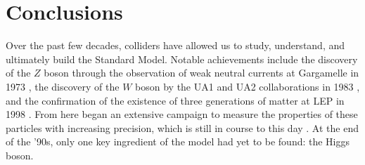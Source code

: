 \documentclass[10pt,a4paper]{book}
\begin{document}
\section{Conclusions}
Over the past few decades, colliders have allowed us to study, understand, and ultimately build the Standard Model. Notable achievements include the discovery of the $Z$ boson through the observation of weak neutral currents at Gargamelle in 1973 \cite{GargamelleNeutrino:1973jyy, HASERT1973121}, the discovery of the $W$ boson by the UA1 and UA2 collaborations in 1983 \cite{UA1:1983crd, UA2:1983tsx}, and the confirmation of the existence of three generations of matter at LEP in 1998 \cite{L3:1998uub}. From here began an extensive campaign to measure the properties of these particles with increasing precision, which is still in course to this day \cite{ATLAS:2017rzl, DeGruttola:2012zz}. At the end of the '90s, only one key ingredient of the model had yet to be found: the Higgs boson.

\nocite{Mangano:2018sfp}
\end{document}
